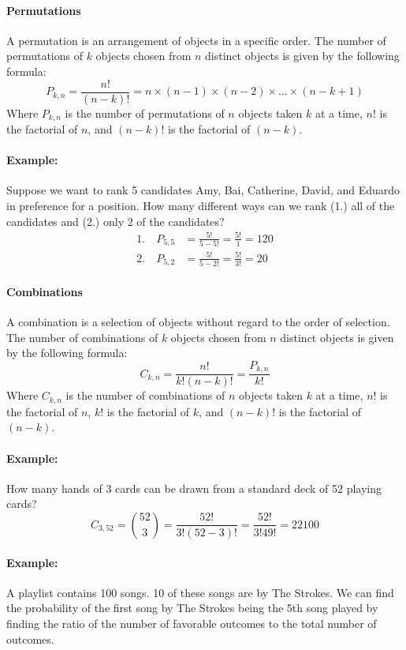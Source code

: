 \paragraph*{Permutations}
A permutation is an arrangement of objects in a specific order. The number of permutations of 
$k$ objects chosen from $n$ distinct objects is given by the following formula:
\[
    P_{k,n} = \frac{n!}{(n-k)!} = n \times (n-1) \times (n-2) \times ... \times (n-k+1)
\]
Where $P_{k,n}$ is the number of permutations of $n$ objects taken $k$ at a time, $n!$ is the factorial of $n$, and $(n-k)!$ is the factorial of $(n-k)$.

\paragraph*{Example:} Suppose we want to rank 5 candidates Amy, Bai, Catherine, David, and Eduardo in preference for a position.
How many different ways can we rank (1.) all of the candidates and (2.) only 2 of the candidates?
\begin{align*}
    1. \quad P_{5,5} &= \frac{5!}{5-5!} = \frac{5!}{1} = 120 \\
    2. \quad P_{5,2} &= \frac{5!}{5-2!} = \frac{5!}{3!} = 20
\end{align*}

\paragraph*{Combinations}
A combination is a selection of objects without regard to the order of selection. The number of combinations
of $k$ objects chosen from $n$ distinct objects is given by the following formula:
\[
    C_{k,n} = \frac{n!}{k!(n-k)!} = \frac{P_{k,n}}{k!}
\]
Where $C_{k,n}$ is the number of combinations of $n$ objects taken $k$ at a time, $n!$ is the factorial of 
$n$, $k!$ is the factorial of $k$, and $(n-k)!$ is the factorial of $(n-k)$.

\paragraph*{Example:}
How many hands of 3 cards can be drawn from a standard deck of 52 playing cards?
\[
    C_{3,52} = \binom{52}{3} = \frac{52!}{3!(52-3)!} = \frac{52!}{3!49!} = 22100
\]

\paragraph*{Example:}
A playlist contains 100 songs. 10 of these songs are by The Strokes. We can find the probability of the first 
song by The Strokes being the 5th song played by finding the ratio of the number of favorable outcomes to the total number of outcomes.


